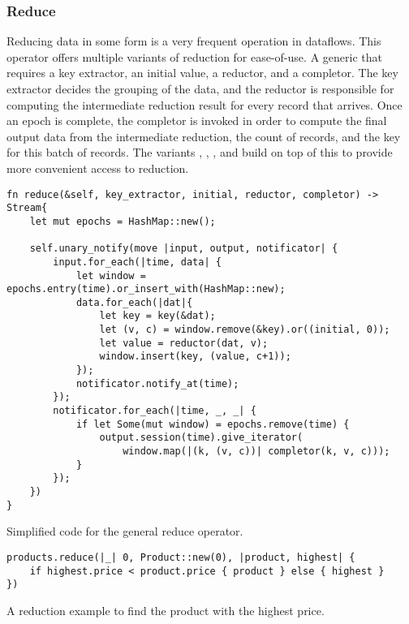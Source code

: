 \subsubsection{Reduce}
Reducing data in some form is a very frequent operation in dataflows. This operator offers multiple variants of reduction for ease-of-use. A generic  that requires a key extractor, an initial value, a reductor, and a completor. The key extractor decides the grouping of the data, and the reductor is responsible for computing the intermediate reduction result for every record that arrives. Once an epoch is complete, the completor is invoked in order to compute the final output data from the intermediate reduction, the count of records, and the key for this batch of records. The variants , , , and  build on top of this to provide more convenient access to reduction.

\begin{listing}[H]
\begin{verbatim}
fn reduce(&self, key_extractor, initial, reductor, completor) -> Stream{
    let mut epochs = HashMap::new();

    self.unary_notify(move |input, output, notificator| {
        input.for_each(|time, data| {
            let window = epochs.entry(time).or_insert_with(HashMap::new);
            data.for_each(|dat|{
                let key = key(&dat);
                let (v, c) = window.remove(&key).or((initial, 0));
                let value = reductor(dat, v);
                window.insert(key, (value, c+1));
            });
            notificator.notify_at(time);
        });
        notificator.for_each(|time, _, _| {
            if let Some(mut window) = epochs.remove(time) {
                output.session(time).give_iterator(
                    window.map(|(k, (v, c))| completor(k, v, c)));
            }
        });
    })
}
\end{verbatim}
  \caption{Simplified code for the general reduce operator.}
  \label{lst:reduce}
\end{listing}

\begin{listing}[H]
\begin{verbatim}
products.reduce(|_| 0, Product::new(0), |product, highest| {
    if highest.price < product.price { product } else { highest }
})
\end{verbatim}
\caption{A reduction example to find the product with the highest price.}
\label{lst:reduce-example}
\end{listing}

